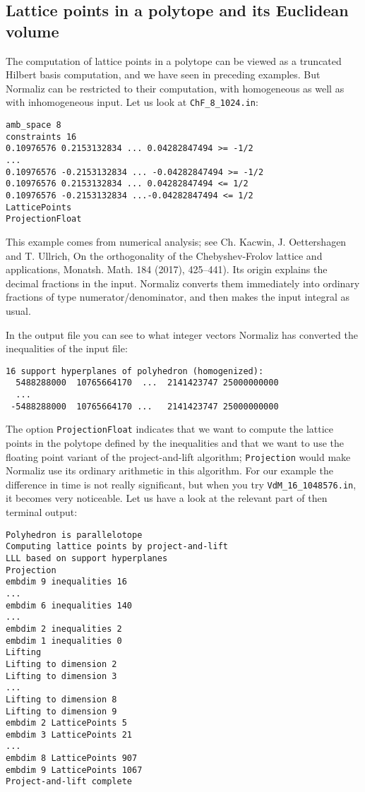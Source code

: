 \documentclass[12pt,a4paper]{scrartcl}
\theoremstyle{definition}
\begin{document}
\subsection{Lattice points in a polytope and its Euclidean volume}\label{project_example}

The computation of lattice points in a polytope can be viewed as a truncated Hilbert basis computation, and we have seen in preceding examples. But Normaliz can be restricted to their computation, with homogeneous as well as with inhomogeneous input. Let us look at \verb|ChF_8_1024.in|:

\begin{Verbatim}
amb_space 8
constraints 16
0.10976576 0.2153132834 ... 0.04282847494 >= -1/2
...
0.10976576 -0.2153132834 ... -0.04282847494 >= -1/2
0.10976576 0.2153132834 ... 0.04282847494 <= 1/2
0.10976576 -0.2153132834 ...-0.04282847494 <= 1/2
LatticePoints
ProjectionFloat
\end{Verbatim}

This example comes from numerical analysis; see Ch. Kacwin, J. Oettershagen and T. Ullrich, On the orthogonality of the Chebyshev-Frolov lattice and applications, Monatsh. Math. 184 (2017), 425--441). Its origin explains the decimal fractions in the input. Normaliz converts them immediately into ordinary fractions of type numerator/denominator, and then makes the input integral as usual.

In the output file you can see to what integer vectors Normaliz has converted the inequalities of the input file:
\begin{Verbatim}
16 support hyperplanes of polyhedron (homogenized):
  5488288000  10765664170  ...  2141423747 25000000000
  ...
 -5488288000  10765664170 ...   2141423747 25000000000
\end{Verbatim}

The option \verb|ProjectionFloat| indicates that we want to compute the lattice points in the polytope defined by the inequalities and that we want to use the floating point variant of the project-and-lift algorithm; \verb|Projection| would make Normaliz use its ordinary arithmetic in this algorithm. For our example the difference in time is not really significant, but when you try \verb|VdM_16_1048576.in|, it becomes very noticeable. Let us have a look at the relevant part of then terminal output:
\begin{Verbatim}
Polyhedron is parallelotope
Computing lattice points by project-and-lift
LLL based on support hyperplanes
Projection
embdim 9 inequalities 16
...
embdim 6 inequalities 140
...
embdim 2 inequalities 2
embdim 1 inequalities 0
Lifting
Lifting to dimension 2
Lifting to dimension 3
...
Lifting to dimension 8
Lifting to dimension 9
embdim 2 LatticePoints 5
embdim 3 LatticePoints 21
...
embdim 8 LatticePoints 907
embdim 9 LatticePoints 1067
Project-and-lift complete
\end{Verbatim}
\end{document}
